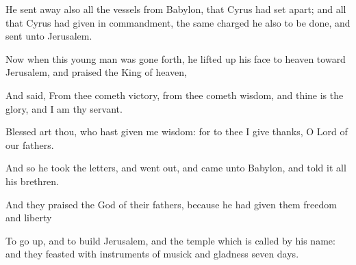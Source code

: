 {\par }{\PP {}He sent away also all the vessels from Babylon, that Cyrus had set apart; and all that Cyrus had given in commandment, the same charged he also to be done, and sent unto Jerusalem.
\par }{\PP {}Now when this young man was gone forth, he lifted up his face to heaven toward Jerusalem, and praised the King of heaven,
\par }{\PP {}And said, From thee cometh victory, from thee cometh wisdom, and thine is the glory, and I am thy servant.
\par }{\PP {}Blessed art thou, who hast given me wisdom: for to thee I give thanks, O Lord of our fathers.
\par }{\PP {}And so he took the letters, and went out, and came unto Babylon, and told it all his brethren.
\par }{\PP {}And they praised the God of their fathers, because he had given them freedom and liberty
\par }{\PP {}To go up, and to build Jerusalem, and the temple which is called by his name: and they feasted with instruments of musick and gladness seven days.

}
